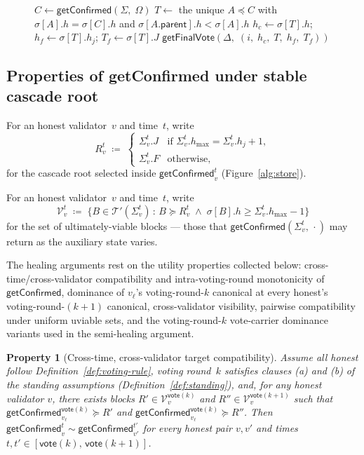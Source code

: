 \ifx\litemode\undefined\documentclass{article}\fi
\newcommand{\T}[0]{\ensuremath{\mathcal{T}}}
\newcommand{\V}[0]{\ensuremath{\mathcal{V}}}
\newcommand{\parent}{\mathsf{parent}}
\newcommand{\hmax}{\ensuremath{h_{\max}}\xspace}
\newcommand{\uviable}{ultimately-viable\xspace}
\newcommand{\vote}{\ensuremath{\mathsf{vote}}}
\newcommand{\getFinalVote}{\textsf{getFinalVote}\xspace}
\newcommand{\getPostSyncerVote}{\textsf{getPostSyncerVote}\xspace}
\newcommand{\getConfirmed}{\textsf{getConfirmed}\xspace}
\theoremstyle{plain}
\newtheorem{property}[theorem]{Property}
\theoremstyle{definition}
\theoremstyle{remark}
\begin{document}
\begin{figure}[H]
\begin{center}
\begin{boxedminipage}{\textwidth}
\begin{algorithmic}[1]
\Function{\getPostSyncerVote}{$\Sigma,\; \Omega,\; \Delta$} 
  \State $C \gets \getConfirmed(\Sigma,\; \Omega)$
  \State $T \gets$ the unique $A \preceq C$ with $\sigma[A].h = \sigma[C].h$ and $\sigma[A.\parent].h < \sigma[A].h$ 
  \State $h_c \gets \sigma[T].h$; \;\; $h_f \gets \sigma[T].h_j$; \;\; $T_f \gets \sigma[T].J$
  \State \Return $\getFinalVote(\Delta,\; (i,\; h_c,\; T,\; h_f,\; T_f))$
\EndFunction

\end{algorithmic}
\end{boxedminipage}
\end{center}
\end{figure}

\subsection{Properties of \getConfirmed{} under stable cascade root}\label{sec:getConfirmed-properties}

For an honest validator~$v$ and time~$t$, write
\[
  R_v^t \;\coloneqq\; \begin{cases}\Sigma_v^t.J & \text{if } \Sigma_v^t.\hmax = \Sigma_v^t.h_j + 1, \\ \Sigma_v^t.F & \text{otherwise,}\end{cases}
\]
for the cascade root selected inside $\getConfirmed_v^t$ (Figure~\ref{alg:store}).

For an honest validator~$v$ and time~$t$, write
\[
  \V_v^t \;\coloneqq\; \{B \in \T'(\Sigma_v^t) \,:\, B \succeq R_v^t \;\wedge\; \sigma[B].h \geq \Sigma_v^t.\hmax-1\}
\]
for the set of \uviable{} blocks --- those that $\getConfirmed(\Sigma_v^t,\, \cdot)$ may return as the auxiliary state varies.

The healing arguments rest on the utility properties collected below: cross-time/cross-validator compatibility and intra-voting-round monotonicity of $\getConfirmed$, dominance of $v_\ell$'s voting-round-$k$ canonical at every honest's voting-round-$(k{+}1)$ canonical, cross-validator visibility, pairwise compatibility under uniform uviable sets, and the voting-round-$k$ vote-carrier dominance variants used in the semi-healing argument.

\begin{property}[Cross-time, cross-validator target compatibility]\label{prop:getConfirmed-compat}
Assume all honest follow Definition~\ref{def:voting-rule}, voting round~$k$ satisfies clauses (a) and (b) of the standing assumptions (Definition~\ref{def:standing}), and, for any honest validator $v$, there exists blocks $R' \in \V_v^{\vote(k)}$ and $R'' \in \V_v^{\vote(k+1)}$ such that $\getConfirmed_{v_\ell}^{\vote(k)} \succeq R'$ and $\getConfirmed_{v_\ell}^{\vote(k)} \succeq R''$.
Then $\getConfirmed_v^t \sim \getConfirmed_{v'}^{t'}$ for every honest pair $v, v'$ and times $t, t' \in [\vote(k),\, \vote(k{+}1)]$.
\end{property}
\end{document}
